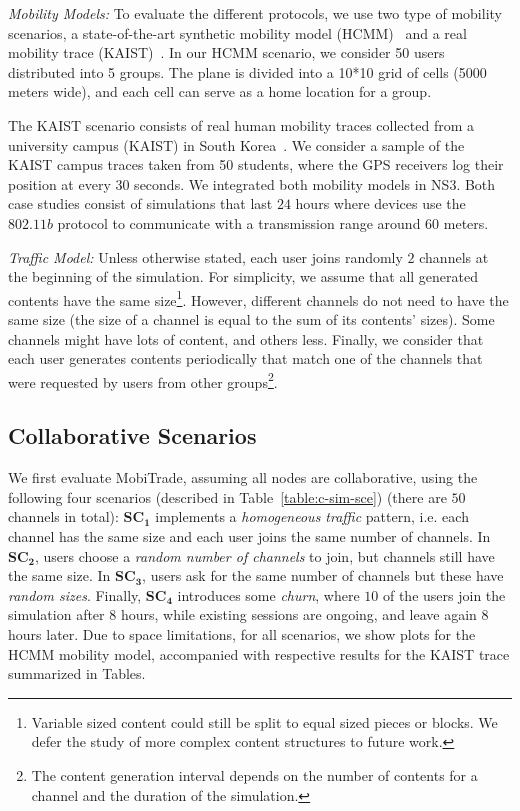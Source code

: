 \emph{Mobility Models:} To evaluate the different protocols, we use two type of mobility scenarios, a state-of-the-art synthetic mobility model (HCMM)~\cite{HCMM} and a real mobility trace (KAIST)~\cite{KAIST}. In our HCMM scenario, we consider 50 users distributed into 5 groups. The plane is divided into a 10*10 grid of cells (5000 meters wide), and each cell can serve as a home location for a group.

The KAIST scenario consists of real human mobility traces collected from a university campus (KAIST) in South Korea~\cite{KAIST}. We consider a sample of the KAIST campus traces taken from 50 students, where the GPS receivers log their position at every $30$ seconds. We integrated both mobility models in NS3. Both case studies consist of simulations that last $24$ hours where devices use the $802.11b$ protocol to communicate with a transmission range around $60$ meters.

\emph{Traffic Model:} Unless otherwise stated, each user joins randomly $2$ channels at the beginning of the simulation. For simplicity, we assume that all generated contents have the same size\footnote{Variable sized content could still be split to equal sized pieces or blocks. We defer the study of more complex content structures to future work.}. However, different channels do not need to have the same size (the size of a channel is equal to the sum of its contents' sizes). Some channels might have lots of content, and others less. Finally, we consider that each user generates contents periodically that match one of the channels that were requested by users from other groups\footnote{The content generation interval depends on the number of contents for a channel and the duration of the simulation.}.

\subsection{Collaborative Scenarios}
\label{collaborative-scenario}

We first evaluate MobiTrade, assuming all nodes are collaborative, using the following four scenarios (described in Table~\ref{table:c-sim-sce}) (there are $50$ channels in total): {$\mathbf{SC_1}$} implements a \emph{homogeneous traffic} pattern, i.e. each channel has the same size and each user joins the same number of channels. In $\mathbf{SC_2}$, users choose a \emph{random number of channels} to join, but channels still have the same size. In $\mathbf{SC_3}$, users ask for the same number of channels but these have \emph{random sizes}. Finally, $\mathbf{SC_4}$ introduces some \emph{churn}, where $10$ of the users join the simulation after $8$ hours, while existing sessions are ongoing, and leave again $8$ hours later. Due to space limitations, for all scenarios, we show plots for the HCMM mobility model, accompanied with respective results for the KAIST trace summarized in Tables.

